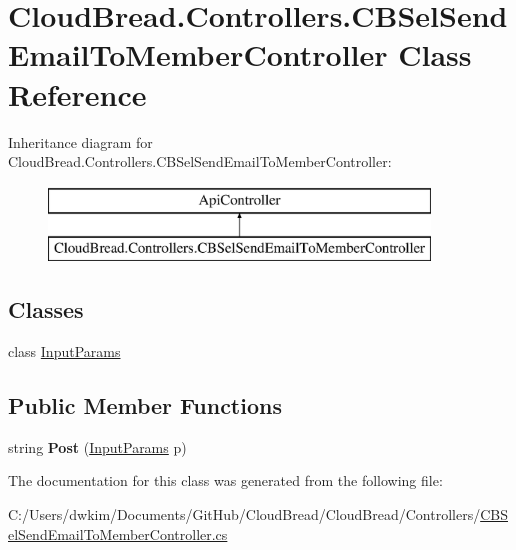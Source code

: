 \hypertarget{a00055}{}\section{Cloud\+Bread.\+Controllers.\+C\+B\+Sel\+Send\+Email\+To\+Member\+Controller Class Reference}
\label{a00055}
Inheritance diagram for Cloud\+Bread.\+Controllers.\+C\+B\+Sel\+Send\+Email\+To\+Member\+Controller\+:\begin{figure}[H]
\begin{center}
\leavevmode
\includegraphics[height=2.000000cm]{a00055}
\end{center}
\end{figure}
\subsection*{Classes}
\begin{DoxyCompactItemize}
\item 
class \hyperlink{a00104}{Input\+Params}
\end{DoxyCompactItemize}
\subsection*{Public Member Functions}
\begin{DoxyCompactItemize}
\item 
string {\bfseries Post} (\hyperlink{a00104}{Input\+Params} p)\hypertarget{a00055_a1e0e460211039ff78137d64d7d4a1958}{}\label{a00055_a1e0e460211039ff78137d64d7d4a1958}

\end{DoxyCompactItemize}


The documentation for this class was generated from the following file\+:\begin{DoxyCompactItemize}
\item 
C\+:/\+Users/dwkim/\+Documents/\+Git\+Hub/\+Cloud\+Bread/\+Cloud\+Bread/\+Controllers/\hyperlink{a00226}{C\+B\+Sel\+Send\+Email\+To\+Member\+Controller.\+cs}\end{DoxyCompactItemize}
